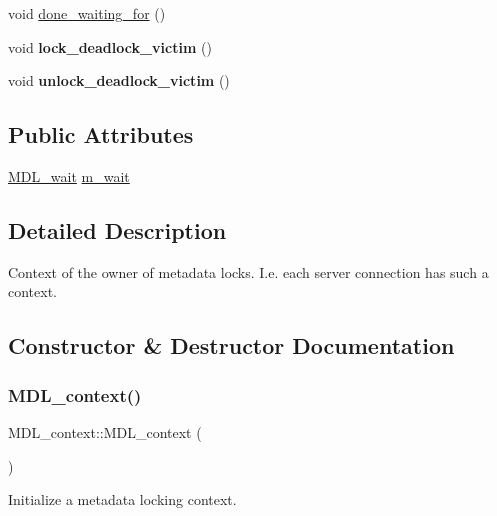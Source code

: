 \begin{DoxyCompactItemize}
\item 
void \mbox{\hyperlink{classMDL__context_ad5d3fb033110d449d894c95f33f6d9b1}{done\+\_\+waiting\+\_\+for}} ()
\item 
\mbox{\label{classMDL__context_aaca0ec235888a94af4dd25107a8af389}} 
void {\bfseries lock\+\_\+deadlock\+\_\+victim} ()
\item 
\mbox{\label{classMDL__context_af3a0ef8ba360e3d48885f711723aa3ea}} 
void {\bfseries unlock\+\_\+deadlock\+\_\+victim} ()
\end{DoxyCompactItemize}
\subsection*{Public Attributes}
\begin{DoxyCompactItemize}
\item 
\mbox{\hyperlink{classMDL__wait}{M\+D\+L\+\_\+wait}} \mbox{\hyperlink{classMDL__context_aeaf51be6c5480bb1e718aea933f55d9d}{m\+\_\+wait}}
\end{DoxyCompactItemize}


\subsection{Detailed Description}
Context of the owner of metadata locks. I.\+e. each server connection has such a context. 

\subsection{Constructor \& Destructor Documentation}
\mbox{\label{classMDL__context_a21b35ef90597dcd411bf091acd1f4a38}} 
\subsubsection{\texorpdfstring{M\+D\+L\+\_\+context()}{MDL\_context()}}
{\footnotesize\ttfamily M\+D\+L\+\_\+context\+::\+M\+D\+L\+\_\+context (\begin{DoxyParamCaption}{ }\end{DoxyParamCaption})}

Initialize a metadata locking context.

